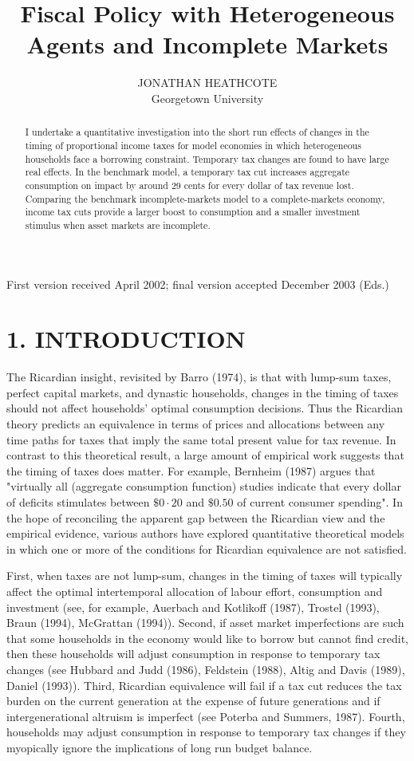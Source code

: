 \documentclass[11pt]{article}
\title{Fiscal Policy with Heterogeneous Agents and Incomplete Markets }
\author{JONATHAN HEATHCOTE\\
Georgetown University}
\date{}
\begin{document}
\maketitle
\captionsetup{singlelinecheck=false}
First version received April 2002; final version accepted December 2003 (Eds.)

\begin{abstract}
I undertake a quantitative investigation into the short run effects of changes in the timing of proportional income taxes for model economies in which heterogeneous households face a borrowing constraint. Temporary tax changes are found to have large real effects. In the benchmark model, a temporary tax cut increases aggregate consumption on impact by around 29 cents for every dollar of tax revenue lost. Comparing the benchmark incomplete-markets model to a complete-markets economy, income tax cuts provide a larger boost to consumption and a smaller investment stimulus when asset markets are incomplete.
\end{abstract}

\section*{1. INTRODUCTION}
The Ricardian insight, revisited by Barro (1974), is that with lump-sum taxes, perfect capital markets, and dynastic households, changes in the timing of taxes should not affect households' optimal consumption decisions. Thus the Ricardian theory predicts an equivalence in terms of prices and allocations between any time paths for taxes that imply the same total present value for tax revenue. In contrast to this theoretical result, a large amount of empirical work suggests that the timing of taxes does matter. For example, Bernheim (1987) argues that "virtually all (aggregate consumption function) studies indicate that every dollar of deficits stimulates between $\$ 0 \cdot 20$ and $\$ 0.50$ of current consumer spending". In the hope of reconciling the apparent gap between the Ricardian view and the empirical evidence, various authors have explored quantitative theoretical models in which one or more of the conditions for Ricardian equivalence are not satisfied.

First, when taxes are not lump-sum, changes in the timing of taxes will typically affect the optimal intertemporal allocation of labour effort, consumption and investment (see, for example, Auerbach and Kotlikoff (1987), Trostel (1993), Braun (1994), McGrattan (1994)). Second, if asset market imperfections are such that some households in the economy would like to borrow but cannot find credit, then these households will adjust consumption in response to temporary tax changes (see Hubbard and Judd (1986), Feldstein (1988), Altig and Davis (1989), Daniel (1993)). Third, Ricardian equivalence will fail if a tax cut reduces the tax burden on the current generation at the expense of future generations and if intergenerational altruism is imperfect (see Poterba and Summers, 1987). Fourth, households may adjust consumption in response to temporary tax changes if they myopically ignore the implications of long run budget balance.
\end{document}
